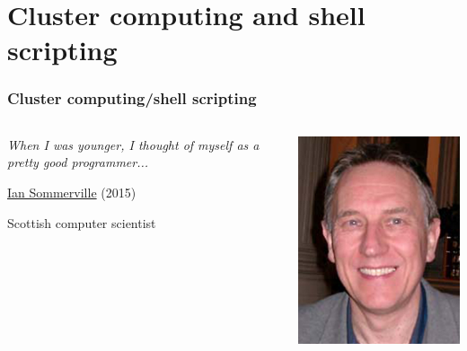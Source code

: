 \documentclass[12pt, 
hyperref={colorlinks=true, linkcolor=blue, urlcolor=cyan}]{beamer}
\newcommand{\myframe}[1]{\begin{frame} \frametitle{#1}}
\begin{document}
\section{Cluster computing and shell scripting}
\myframe{Cluster computing/shell scripting}
\begin{columns}[c]
\begin{column}{.66\textwidth}
\vspace{1cm}

\emph{When I was younger, I thought of myself as a pretty good programmer...}

\vspace{2cm}
\href{http://www.software-engin.com/}{Ian Sommerville} (2015)

Scottish computer scientist
\end{column}
\begin{column}{.33\textwidth}
\includegraphics[width=1\textwidth]{sommerville.jpg}
\end{column}
\end{columns}
\end{frame}
\end{document}
